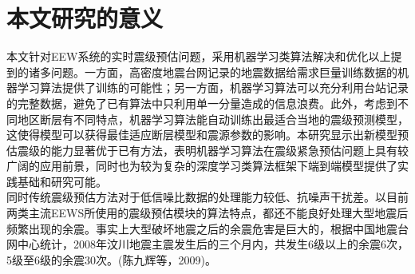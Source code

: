 \section{本文研究的意义}
\indent 本文针对EEW系统的实时震级预估问题，采用机器学习类算法解决和优化以上提到的诸多问题。一方面，高密度地震台网记录的地震数据给需求巨量训练数据的机器学习算法提供了训练的可能性；另一方面，机器学习算法可以充分利用台站记录的完整数据，避免了已有算法中只利用单一分量造成的信息浪费。此外，考虑到不同地区断层有不同特点，机器学习算法能自动训练出最适合当地的震级预测模型，这使得模型可以获得最佳适应断层模型和震源参数的影响。本研究显示出新模型预估震级的能力显著优于已有方法，表明机器学习算法在震级紧急预估问题上具有较广阔的应用前景，同时也为较为复杂的深度学习类算法框架下端到端模型提供了实践基础和研究可能。\\
\indent 同时传统震级预估方法对于低信噪比数据的处理能力较低、抗噪声干扰差。以目前两类主流EEWS所使用的震级预估模块的算法特点，都还不能良好处理大型地震后频繁出现的余震。事实上大型破坏地震之后的余震危害是巨大的，根据中国地震台网中心统计，2008年汶川地震主震发生后的三个月内，共发生6级以上的余震6次，5级至6级的余震30次。(陈九辉等，2009)。\\
